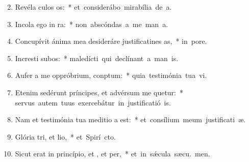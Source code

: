 \begin{flushleft}
\begin{enumerate}[leftmargin=*]
\setcounter{enumi}{1}

\item Revéla culos os:~* \mbox{et considerábo mirabília de  a.}
\item Incola ego  in ra:~* \mbox{non abscóndas a me man a.}
\item Concupívit ánima mea desideráre justificatines as,~* \mbox{in  pore.}
\item Incresti subos:~* \mbox{maledícti qui declínant a man is.}
\item Aufer a me oppróbrium,  conptum:~* \mbox{quia testimónia tua vi.}
\item Etenim sedérunt príncipes, et advérsum me quetur:~* \mbox{servus autem tuus exercebátur in justificatió is.}
\item Nam et testimónia tua meditio a est:~* \mbox{et consílium meum justificati æ.}
\item Glória tri, et lio,~* \mbox{et Spirí cto.}
\item Sicut erat in princípio, et , et per,~* \mbox{et in s\'{\ae}cula sæcu. men.}


\end{enumerate}
\end{flushleft}

